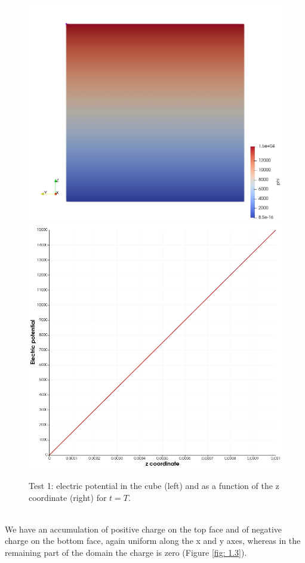 \documentclass{Configuration_Files/PoliMi3i_thesis}
\begin{document}
\begin{figure}[h!]
    \centering
   \includegraphics[scale=0.2]{Images/1.pot_3d.jpeg}
   \includegraphics[scale=0.2]{Images/1.pot.jpeg}
    \caption {Test 1: electric potential in the cube (left) and as a function of the z coordinate (right) for $t=T$.}
    \label{fig: 1.2}
\end{figure}
\\We have an accumulation of positive charge on the top face and of negative charge on the bottom face, again uniform along the x and y axes, whereas in the remaining part of the domain the charge is zero (Figure \ref{fig: 1.3}).
\end{document}
